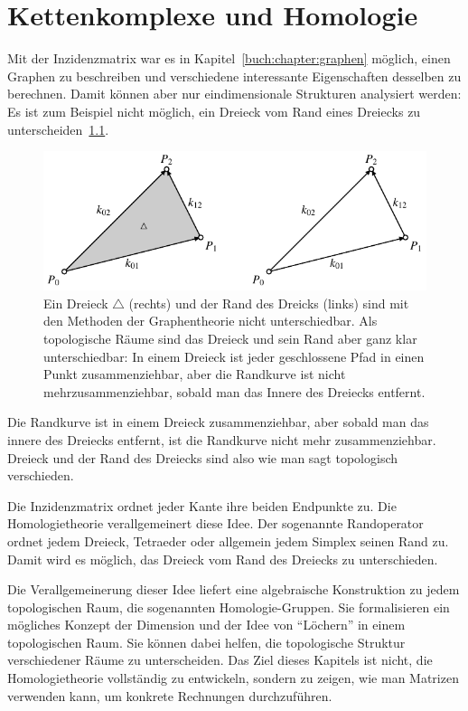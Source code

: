 %
%
%
\chapter{Kettenkomplexe und Homologie
\label{buch:chapter:homologie}}
\rhead{}
Mit der Inzidenzmatrix war es in Kapitel~\ref{buch:chapter:graphen}
möglich, einen Graphen zu beschreiben
und verschiedene interessante Eigenschaften desselben zu berechnen.
Damit können aber nur eindimensionale Strukturen analysiert werden:
Es ist zum Beispiel nicht möglich, ein Dreieck vom Rand eines
Dreiecks zu unterscheiden~\ref{buch:homologie:figure:zusammenziehbar}.
\begin{figure}
\centering
\includegraphics{chapters/95-homologie/images/dreieck.pdf}
\caption{Ein Dreieck $\triangle$ (rechts) und der Rand des Dreicks
(links) sind mit den Methoden
der Graphentheorie nicht unterschiedbar. 
Als topologische Räume sind das Dreieck und sein Rand aber ganz klar
unterschiedbar: In einem Dreieck ist jeder geschlossene Pfad in einen 
Punkt zusammenziehbar, aber die Randkurve ist nicht mehrzusammenziehbar,
sobald man das Innere des Dreiecks entfernt.
\label{buch:homologie:figure:zusammenziehbar}}
\end{figure}
Die Randkurve ist in einem Dreieck zusammenziehbar, aber sobald man
das innere des Dreiecks entfernt, ist die Randkurve nicht mehr
zusammenziehbar.
Dreieck und der Rand des Dreiecks sind also wie man sagt topologisch verschieden.

Die Inzidenzmatrix ordnet jeder Kante ihre beiden Endpunkte zu.
Die Homologietheorie verallgemeinert diese Idee.
Der sogenannte Randoperator ordnet jedem Dreieck, Tetraeder oder allgemein
jedem Simplex seinen Rand zu.
Damit wird es möglich, das Dreieck vom Rand des Dreiecks zu unterschieden.

Die Verallgemeinerung dieser Idee liefert eine algebraische Konstruktion
zu jedem topologischen Raum, die sogenannten Homologie-Gruppen.
Sie formalisieren ein mögliches Konzept der Dimension und der
Idee von ``Löchern'' in einem topologischen Raum.
Sie können dabei helfen, die topologische Struktur verschiedener
Räume zu unterscheiden.
Das Ziel dieses Kapitels ist nicht, die Homologietheorie 
vollständig zu entwickeln, sondern zu zeigen, wie man Matrizen
verwenden kann, um konkrete Rechnungen durchzuführen.




%








